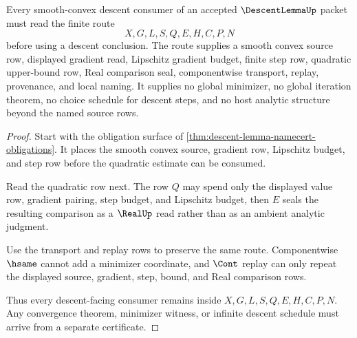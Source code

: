 \begin{theorem}
\label{thm:descent-lemma-quadratic-bound-route}
Every smooth-convex descent consumer of an accepted $\DescentLemmaUp$ packet must read the finite route
$$
X,G,L,S,Q,E,H,C,P,N
$$
before using a descent conclusion. The route supplies a smooth convex source row, displayed gradient read, Lipschitz gradient budget, finite step row, quadratic upper-bound row, Real comparison seal, componentwise transport, replay, provenance, and local naming. It supplies no global minimizer, no global iteration theorem, no choice schedule for descent steps, and no host analytic structure beyond the named source rows.
\end{theorem}
\begin{proof}
Start with the obligation surface of \autoref{thm:descent-lemma-namecert-obligations}. It places the smooth convex source, gradient row, Lipschitz budget, and step row before the quadratic estimate can be consumed.

Read the quadratic row next. The row $Q$ may spend only the displayed value row, gradient pairing, step budget, and Lipschitz budget, then $E$ seals the resulting comparison as a $\RealUp$ read rather than as an ambient analytic judgment.

Use the transport and replay rows to preserve the same route. Componentwise $\hsame$ cannot add a minimizer coordinate, and $\Cont$ replay can only repeat the displayed source, gradient, step, bound, and Real comparison rows.

Thus every descent-facing consumer remains inside $X,G,L,S,Q,E,H,C,P,N$. Any convergence theorem, minimizer witness, or infinite descent schedule must arrive from a separate certificate.
\end{proof}


\begin{closurestatus}{\DescentLemmaUp}
  \theoryclosure{\seedClosure}
  \formalstatus{\unformalizedV}
\end{closurestatus}
